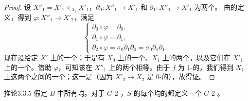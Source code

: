 \begin{proof}
设 $X''_1=X'_1\times_{X_1}X'_1$，$\partial_0:X''_1\to X'_1$ 和 $\partial_1:X''_1\to X'_1$ 为两个。
由的定义，得到 $\varphi:X''_1\to X'_2$，满足
\[
\begin{cases}
\partial_0\circ\varphi=\partial_0,\\
\partial_1\circ\varphi=\partial_1,\\
\partial_2\circ\varphi=\sigma_0\partial_1\partial_0=\sigma_0\partial_1\partial_1.
\end{cases}
\]
现在设给定 $X'$ 上的一个；于是有 $X_0$ 上的一个、$X_1$ 上的两个，以及它们在 $X'_1$ 上的一个。借助 $\varphi$，可知该在 $X''_1$ 上的两个相等。由于 $f$ 为 1-的，我们得到 $X_1$ 上这两个之间的一个；这一是（因为 $X'_2\to X_2$ 是 0-的），故得证。
\end{proof}
\begin{SGAresult}{推论}{3.3.5}
假定 $B$ 中所有均。对于 $G$-2-，$S$ 的每个均的都定义一个 $G$-2-。
\end{SGAresult}

